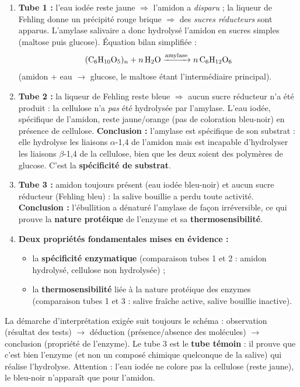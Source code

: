 \documentclass[11pt]{article}
\newcommand{\cle}[1]{{\popxbold\color{popdark}#1}}
\begin{document}
\begin{corrige}
\begin{enumerate}
    \item \textbf{Tube 1 :} l'eau iodée reste jaune $\Rightarrow$ l'amidon a \emph{disparu} ; la liqueur de Fehling donne un précipité rouge brique $\Rightarrow$ des \emph{sucres réducteurs} sont apparus. L'amylase salivaire a donc hydrolysé l'amidon en sucres simples (maltose puis glucose). Équation bilan simplifiée :
    \[ \ce{(C6H10O5)_{n} + n H2O ->[amylase] n C6H12O6} \]
    (amidon + eau $\rightarrow$ glucose, le maltose étant l'intermédiaire principal).
    \item \textbf{Tube 2 :} la liqueur de Fehling reste bleue $\Rightarrow$ aucun sucre réducteur n'a été produit : la cellulose n'a \emph{pas} été hydrolysée par l'amylase. L'eau iodée, spécifique de l'amidon, reste jaune/orange (pas de coloration bleu-noir) en présence de cellulose. \textbf{Conclusion :} l'amylase est \cle{spécifique} de son substrat : elle hydrolyse les liaisons $\alpha$-1,4 de l'amidon mais est incapable d'hydrolyser les liaisons $\beta$-1,4 de la cellulose, bien que les deux soient des polymères de glucose. C'est la \textbf{spécificité de substrat}.
    \item \textbf{Tube 3 :} amidon toujours présent (eau iodée bleu-noir) et aucun sucre réducteur (Fehling bleu) : la salive bouillie a perdu toute activité. \textbf{Conclusion :} l'ébullition a \cle{dénaturé} l'amylase de façon irréversible, ce qui prouve la \textbf{nature protéique} de l'enzyme et sa \textbf{thermosensibilité}.
    \item \textbf{Deux propriétés fondamentales mises en évidence :}
    \begin{itemize}
        \item la \textbf{spécificité enzymatique} (comparaison tubes 1 et 2 : amidon hydrolysé, cellulose non hydrolysée) ;
        \item la \textbf{thermosensibilité} liée à la nature protéique des enzymes (comparaison tubes 1 et 3 : salive fraîche active, salive bouillie inactive).
    \end{itemize}
\end{enumerate}
\end{corrige}

\begin{attention}
La démarche d'interprétation exigée suit toujours le schéma : observation (résultat des tests) $\rightarrow$ déduction (présence/absence des molécules) $\rightarrow$ conclusion (propriété de l'enzyme). Le tube 3 est le \textbf{tube témoin} : il prouve que c'est bien l'enzyme (et non un composé chimique quelconque de la salive) qui réalise l'hydrolyse. Attention : l'eau iodée ne colore pas la cellulose (reste jaune), le bleu-noir n'apparaît que pour l'amidon.
\end{attention}
\end{document}
